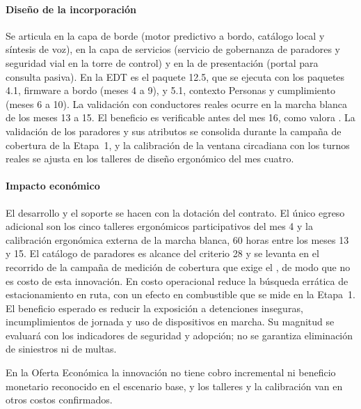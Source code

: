 \paragraph{Diseño de la incorporación} Se articula en la capa de borde (motor predictivo a bordo,
catálogo local y síntesis de voz), en la capa de servicios (servicio de gobernanza de paradores y
seguridad vial en la torre de control) y en la de presentación (portal para consulta pasiva). En la
EDT es el paquete 12.5, que se ejecuta con los paquetes 4.1, firmware a bordo (meses 4 a 9), y 5.1,
contexto Personas y cumplimiento (meses 6 a 10). La validación con conductores reales ocurre en la
marcha blanca de los meses 13 a 15. El beneficio es verificable antes
del mes 16, como valora . La validación de los paradores y sus atributos se
consolida durante la campaña de cobertura de la Etapa~1, y la calibración de la ventana circadiana con
los turnos reales se ajusta en los talleres de diseño ergonómico del mes cuatro.

\paragraph{Impacto económico} El desarrollo y el soporte se hacen con la dotación del contrato. El único
egreso adicional son los cinco talleres ergonómicos participativos del mes 4 y la calibración ergonómica
externa de la marcha blanca, 60 horas entre los meses 13 y 15. El catálogo de paradores es alcance del criterio 28 y se levanta
en el recorrido de la campaña de medición de cobertura que exige el , de modo que
no es costo de esta innovación. En costo operacional
reduce la búsqueda errática de estacionamiento en ruta, con un efecto en combustible que se mide en la
Etapa~1. El beneficio esperado es reducir la exposición a detenciones inseguras, incumplimientos de jornada y uso de dispositivos en marcha. Su magnitud se evaluará con los indicadores de seguridad y adopción; no se garantiza eliminación de siniestros ni de multas.

En la Oferta Económica la innovación no tiene cobro incremental ni beneficio monetario reconocido en el escenario base, y los talleres y la calibración van en otros costos confirmados.

